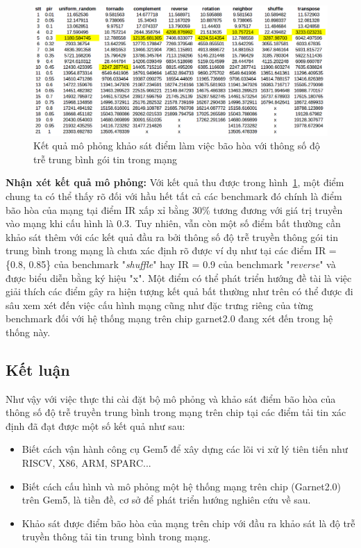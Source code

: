 \documentclass{article}
\begin{document}
\begin{figure}[h!]
	\centering
	\includegraphics[width=1\linewidth]{images/outputs_results}
	\caption{Kết quả mô phỏng khảo sát điểm làm việc bão hòa với thông số độ trễ trung bình gói tin trong mạng}
	\label{fig:outputs_results}
\end{figure}

\textbf{Nhận xét kết quả mô phỏng:}
Với kết quả thu được trong hình~\ref{fig:outputs_results}, một điểm chung ta có thể thấy rõ đối với hầu hết tất cả các benchmark đó chính là điểm bão hòa của mạng tại điểm IR xấp xỉ bằng 30\% tương đương với giá trị truyền vào mạng khi cấu hình là 0.3. Tuy nhiên, vẫn còn một số điểm bất thường cần khảo sát thêm với các kết quả đầu ra bởi thông số độ trễ truyền thông gói tin trung bình trong mạng là chưa xác định rõ được ví dụ như tại các điểm IR = \{0.8, 0.85\} của benchmark "\textit{shuffle}" hay IR = 0.9 của benchmark "\textit{reverse}" và được biểu diễn bằng ký hiệu "x". Một điểm có thể phát triển hướng đề tài là việc giải thích các điểm gây ra hiện tượng kết quả bất thường như trên có thể được đi sâu xem xét đến việc cấu hình mạng cũng như đặc trưng riêng của từng benchmark đối với hệ thống mạng trên chip garnet2.0 đang xét đến trong hệ thống này.
\subsection{Kết luận}\label{conclustion}
Như vậy với việc thực thi cài đặt bộ mô phỏng và khảo sát điểm bão hòa của thông số độ trễ truyền trung bình trong mạng trên chip tại các điểm tải tin xác định đã đạt được một số kết quả như sau:
\begin{itemize}
	\item Biết cách vận hành công cụ Gem5 để xây dựng các lõi vi xử lý tiên tiến như RISCV, X86, ARM, SPARC...
	\item Biết cách cấu hình và mô phỏng một hệ thống mạng trên chip (Garnet2.0) trên Gem5, là tiền đề, cơ sở để phát triển hướng nghiên cứu về sau.
	\item Khảo sát được điểm bão hòa của mạng trên chip với đầu ra khảo sát là độ trễ truyền thông tải tin trung bình trong mạng.
\end{itemize}
\end{document}
